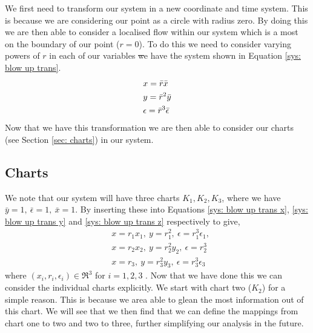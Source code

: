 
We first need to transform our system in a new coordinate and time system. This is because we are considering our point as a circle with radius zero. By doing this we are then able to consider a localised flow within our system which is a most on the boundary of our point ($r=0$). To do this we need to consider varying powers of $r$ in each of our variables \st we have the system shown in Equation \ref{sys: blow up trans}.  
\begin{subequations}
    \begin{align}
        &x=\Bar{r}\Bar{x}  \label{sys: blow up trans x}\\
        &y=\Bar{r}^2\Bar{y} \label{sys: blow up trans y}\\ 
        &\epsilon=\bar{r}^3\bar{\epsilon} \label{sys: blow up trans z}
    \end{align}  
    \label{sys: blow up trans}
\end{subequations}
Now that we have this transformation we are then able to consider our charts (see Section \ref{sec: charts}) in our system.

\subsection{Charts}
We note that our system will have three charts $ K_1,K_2,K_3 $, where we have $ \bar{y}=1, \ \bar{\epsilon}=1, \ \bar{x}=1 $. By inserting these into Equations \ref{sys: blow up trans x}, \ref{sys: blow up trans y} and \ref{sys: blow up trans z} respectively to give, 
\begin{subequations}
	\begin{align}
	&x=r_1x_1, \ y=r_1^2, \ \epsilon=r_1^3\epsilon_1,\\
	&x=r_2x_2, \ y=r_2^2y_2, \ \epsilon=r_2^3 \label{sys: K2}\\
	&x=r_3, \ y=r_3^2y_3, \ \epsilon=r_3^3\epsilon_3\label{sys:K3}
	\end{align}
\end{subequations}
where $ (x_i,r_i,\epsilon_i)\in\Re^3 $ for $ i=1,2,3 $ \citep{krupa2001}. Now that we have done this we can consider the individual charts explicitly. We start with chart two ($K_2$) for a simple reason. This is because we area able to glean the most information out of this chart. We will see that we then find that we can define the mappings from chart one to two and two to three, further simplifying our analysis in the future.

